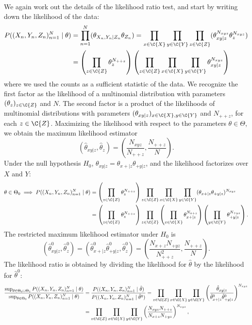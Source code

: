 We again work out the details of the likelihood ratio test, and 
start by writing down the likelihood of the data:
\begin{equation*}\begin{split}
  P((X_n,Y_n,Z_n)_{n=1}^N \mid \theta) 
  &= \prod_{n=1}^N (\theta_{X_n,Y_n|Z_n} \theta_{Z_n}) 
   = \prod_{x\in\C{X}} \prod_{y\in\C{Y}} \prod_{z\in\C{Z}} (\theta_{xy|z}^{N_{xyz}} \theta_z^{N_{xyz}}) \\
  &= \left( \prod_{z \in \C{Z}} \theta_z^{N_{+ + z}} \right) \left(\prod_{z \in \C{Z}}\prod_{x\in\C{X}} \prod_{y\in\C{Y}} \theta_{xy|z}^{N_{xyz}}\right)
\end{split}\end{equation*}
where we used the counts as a sufficient statistic of the data. 
We recognize the first factor as the likelihood of a multinomial
distribution with parameters $(\theta_z)_{z\in\C{Z}}$ and $N$.
The second factor is a product of the likelihoods
of multinomial distributions with parameters $(\theta_{xy|z})_{x\in\C{X},y\in\C{Y}}$ and $N_{++ z}$,
for each $z \in \C{Z}$.
Maximizing the likelihood with respect to the parameters $\theta \in \Theta$, we obtain the maximum likelihood estimator
$$\left(\hat \theta_{xy|z},\hat \theta_z\right) = \left(\frac{N_{xyz}}{N_{++ z}},\frac{N_{++ z}}{N}\right).$$
Under the null hypothesis $H_0$, $\theta_{xy|z} = \theta_{x+|z}\theta_{+ y|z}$, and the likelihood factorizes over $X$
and $Y$:
\begin{equation*}\begin{split}
  \theta \in \Theta_0 \implies P((X_n,Y_n,Z_n)_{n=1}^N \mid \theta) 
  &= \left( \prod_{z \in \C{Z}} \theta_z^{N_{+ + z}} \right) \prod_{z \in \C{Z}}\prod_{x\in\C{X}} \prod_{y\in\C{Y}} (\theta_{x+|z} \theta_{+ y|z})^{N_{xyz}} \\
  &= \left( \prod_{z \in \C{Z}} \theta_z^{N_{+ + z}} \right) \prod_{z \in \C{Z}} \left(\prod_{x\in\C{X}} \theta_{x+|z}^{N_{x+ z}} \right) \left(\prod_{y\in\C{Y}} \theta_{+ y|z}^{N_{+ yz}} \right).
\end{split}\end{equation*}
The restricted maximum likelihood estimator under $H_0$ is 
$$\left(\hat \theta^0_{xy|z},\hat \theta^0_z\right) = \left(\hat \theta^0_{x+|z} \hat \theta^0_{+ y|z},\hat \theta^0_z\right) = \left(\frac{N_{x+ z} N_{+ y z}}{N_{++ z}^2},\frac{N_{++ z}}{N}\right).$$
The likelihood ratio is obtained by dividing the likelihood for $\hat \theta$ by the likelihood for $\hat \theta^0$:
\begin{equation*}\begin{split}
\frac{\sup_{\theta\in\Theta_0\cup\Theta_1} P((X_n,Y_n,Z_n)_{n=1}^N \mid \theta)}{\sup_{\theta\in\Theta_0} P((X_n,Y_n,Z_n)_{n=1}^N \mid \theta)}
  & = \frac{P((X_n,Y_n,Z_n)_{n=1}^N \mid \hat\theta)}{P((X_n,Y_n,Z_n)_{n=1}^N \mid \hat\theta^0)}
    = \prod_{z\in\C{Z}} \prod_{x\in\C{X}} \prod_{y\in\C{Y}} \left(\frac{\hat \theta_{xy|z}}{\hat \theta^0_{x+|z} \hat \theta^0_{+ y|z}}\right)^{N_{xyz}} \\
  & = \prod_{z\in\C{Z}} \prod_{x\in\C{X}} \prod_{y\in\C{Y}} \left(\frac{N_{xyz} N_{++ z}}{N_{x+ z} N_{+ y z}}\right)^{N_{xyz}},
\end{split}\end{equation*}
